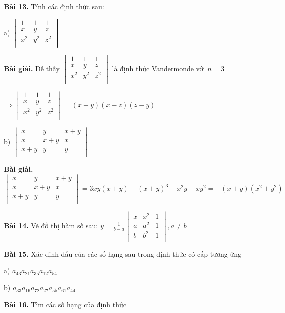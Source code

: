 \documentclass[12pt]{report}
\begin{document}
\textbf{Bài 13.} Tính các định thức sau:

a) $\begin{vmatrix}
	1 & 1 & 1 \\ 
	x & y & z \\
	x^2 & y^2 & z^2 \\
\end{vmatrix}$

\textbf{Bài giải.} Dễ thấy $\begin{vmatrix}
	1 & 1 & 1 \\ 
	x & y & z \\
	x^2 & y^2 & z^2 \\
\end{vmatrix}$ là định thức Vandermonde với $n=3$ 

$\Rightarrow \begin{vmatrix}
	1 & 1 & 1 \\ 
	x & y & z \\
	x^2 & y^2 & z^2 \\
\end{vmatrix} = (x-y)(x-z)(z-y)$

b) $\begin{vmatrix}
	x & y & x+y \\ 
	x & x+y & x \\
	x+y & y & y \\
\end{vmatrix}$

\textbf{Bài giải.} $\begin{vmatrix}
	x & y & x+y \\ 
	x & x+y & x \\
	x+y & y & y \\
\end{vmatrix} = 3xy(x+y) - (x+y)^3 - x^2y - xy^2 = -(x+y)(x^2+y^2)$

\textbf{Bài 14.} Vẽ đồ thị hàm số sau: $y = \frac{1}{b-a}\begin{vmatrix}
	x & x^2 & 1 \\ 
	a & a^2 & 1 \\
	b & b^2 & 1 \\
\end{vmatrix}, a \neq b$

\textbf{Bài 15.} Xác định dấu của các số hạng sau trong định thức có cấp tương ứng 

a) $a_{43}a_{21}a_{35}a_{12}a_{54}$

b) $a_{33}a_{16}a_{72}a_{27}a_{55}a_{61}a_{44}$

\textbf{Bài 16.} Tìm các số hạng của định thức
\end{document}
